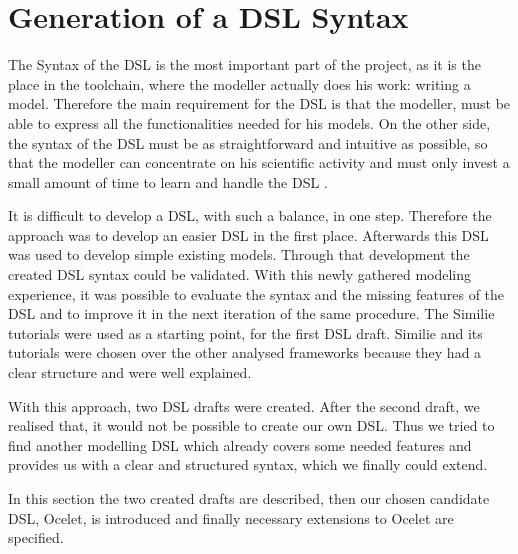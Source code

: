 \chapter{Generation of a DSL Syntax}
\par
The Syntax of the DSL is the most important part of the project, as it is the place in the toolchain, where the modeller actually does his work: writing a model. Therefore the main requirement for the DSL is that the modeller, must be able to express all the functionalities needed for his models. On the other side, the syntax of the DSL must be as straightforward and intuitive as possible, so that the modeller can concentrate on his scientific activity and must only invest a small amount of time to learn and handle the DSL \autocite{dsl:mernik}.
\par
It is difficult to develop a DSL, with such a balance, in one step. Therefore the approach was to develop an easier DSL in the first place. Afterwards this DSL was used to develop simple existing models. Through that development the created DSL syntax could be validated. With this newly gathered modeling experience, it was possible to evaluate the syntax and the missing features of the DSL and to improve it in the next iteration of the same procedure.
The Similie tutorials were used as a starting point, for the first DSL draft. Similie and its tutorials were chosen over the other analysed frameworks because they had a clear structure and were well explained.
\par
With this approach, two DSL drafts were created. After the second draft, we realised that, it would not be possible to create our own DSL. Thus we tried to find another modelling DSL which already covers some needed features and provides us with a clear and structured syntax, which we finally could extend.
\par
In this section the two created drafts are described, then our chosen candidate DSL, Ocelet, is introduced and finally necessary extensions to Ocelet are specified.

